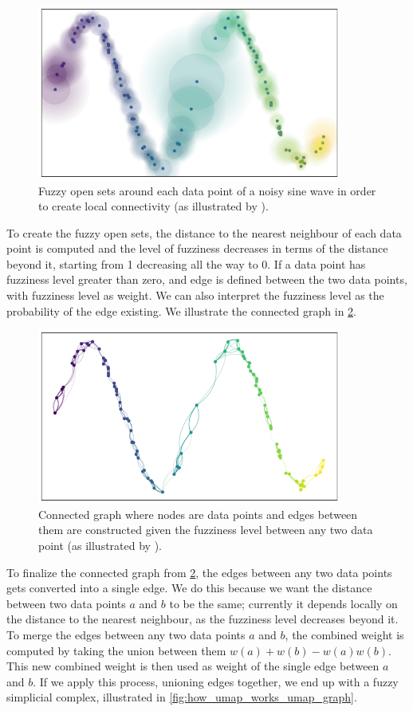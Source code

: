 \begin{figure}[H]
    \centering
    \includegraphics[width=10cm]{thesis/figures/how_umap_works_umap_open_cover.png}
    \caption{Fuzzy open sets around each data point of a noisy sine wave in order to create local connectivity (as illustrated by \cite{how-umap-works-2018}).}
    \label{fig:how_umap_works_umap_open_cover}
\end{figure}
To create the fuzzy open sets, the distance to the nearest neighbour of each data point is computed and the level of fuzziness decreases in terms of the distance beyond it, starting from 1 decreasing all the way to 0. If a data point has fuzziness level greater than zero, and edge is defined between the two data points, with fuzziness level as weight. We can also interpret the fuzziness level as the probability of the edge existing. We illustrate the connected graph in \cref{fig:how_umap_works_raw_graph}.

\begin{figure}[H]
    \centering
    \includegraphics[width=10cm]{thesis/figures/how_umap_works_raw_graph.png}
    \caption{Connected graph where nodes are data points and edges between them are constructed given the fuzziness level between any two data point (as illustrated by \cite{how-umap-works-2018}).}
    \label{fig:how_umap_works_raw_graph}
\end{figure}
To finalize the connected graph from \cref{fig:how_umap_works_raw_graph}, the edges between any two data points gets converted into a single edge. We do this because we want the distance between two data points $a$ and $b$ to be the same; currently it depends locally on the distance to the nearest neighbour, as the fuzziness level decreases beyond it. To merge the edges between any two data points $a$ and $b$, the combined weight is computed by taking the union between them $w(a) + w(b) - w(a)w(b)$. This new combined weight is then used as weight of the single edge between $a$ and $b$. If we apply this process, unioning edges together, we end up with a fuzzy simplicial complex, illustrated in \cref{fig:how_umap_works_umap_graph}.

